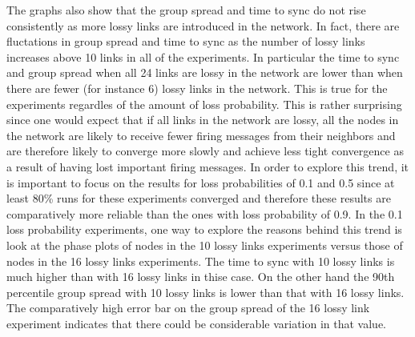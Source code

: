 \noindent
The graphs also show that the group spread and time to sync do not rise consistently as more lossy links
are introduced in the network.  In fact, there are fluctations in group spread and time to sync as the
number of lossy links increases above 10 links in all of the experiments.  In particular the time to sync and
group spread when all 24 links are lossy in the network are lower than when there are fewer (for instance 6) lossy links
in the network.  This is true for the experiments regardles of the amount of loss probability.  
This is rather surprising since one would expect that if all links in the network 
are lossy, all the nodes in the network are likely to receive fewer firing messages from their neighbors
and are therefore likely to converge more slowly and achieve less tight convergence as a result of having
lost important firing messages.
In order to explore this trend, it is important to focus on the results for loss probabilities 
of 0.1 and 0.5 since at least 80\% runs for these experiments converged and therefore 
these results are comparatively more reliable than the ones with loss probability of 0.9.
In the 0.1 loss probability experiments, one way to explore the reasons behind this trend is look 
at the phase plots of nodes in the 10 lossy links experiments versus those of nodes in the 16 lossy links 
experiments. The time to sync with 10 lossy links is much higher than with 16 lossy links in thise case.
On the other hand the 90th percentile group spread with 10 lossy links is lower than that
with 16 lossy links.  The comparatively high error bar on the group spread of the 16 lossy link experiment indicates that 
there could be considerable variation in that value. \newpage

